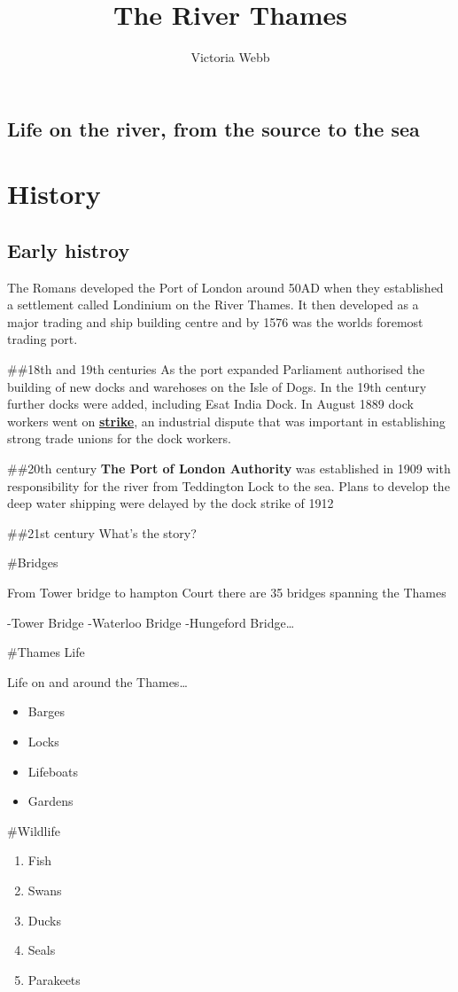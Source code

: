 \documentclass[
  openany]{book}
\title{The River Thames}
\author{Victoria Webb}
\date{}
\providecommand{\tightlist}{%
  \setlength{\itemsep}{0pt}\setlength{\parskip}{0pt}}
\begin{document}
\maketitle

{
\setcounter{tocdepth}{1}
\tableofcontents
}
\hypertarget{life-on-the-river-from-the-source-to-the-sea}{%
\section{Life on the river, from the source to the sea}\label{life-on-the-river-from-the-source-to-the-sea}}

\hypertarget{history}{%
\chapter{History}\label{history}}

\hypertarget{early-histroy}{%
\section{Early histroy}\label{early-histroy}}

The Romans developed the Port of London around 50AD when they established a settlement called Londinium on the River Thames.
It then developed as a major trading and ship building centre and by 1576 was the worlds foremost trading port.

\#\#18th and 19th centuries
As the port expanded Parliament authorised the building of new docks and warehoses on the Isle of Dogs.
In the 19th century further docks were added, including Esat India Dock.
In August 1889 dock workers went on \textbf{\href{https://en.wikipedia.org/wiki/London_dock_strike,_1889}{strike}}, an industrial dispute that was important in establishing strong trade unions for the dock workers.

\#\#20th century
\textbf{The Port of London Authority} was established in 1909 with responsibility for the river from Teddington Lock to the sea.
Plans to develop the deep water shipping were delayed by the dock strike of 1912

\#\#21st century
What's the story?

\#Bridges

From Tower bridge to hampton Court there are 35 bridges spanning the Thames

-Tower Bridge
-Waterloo Bridge
-Hungeford Bridge\ldots{}

\#Thames Life

Life on and around the Thames\ldots{}

\begin{itemize}
\tightlist
\item
  Barges
\item
  Locks
\item
  Lifeboats
\item
  Gardens
\end{itemize}

\#Wildlife

\begin{enumerate}
\def\labelenumi{\arabic{enumi}.}
\tightlist
\item
  Fish
\item
  Swans
\item
  Ducks
\item
  Seals
\item
  Parakeets
\end{enumerate}
\end{document}
